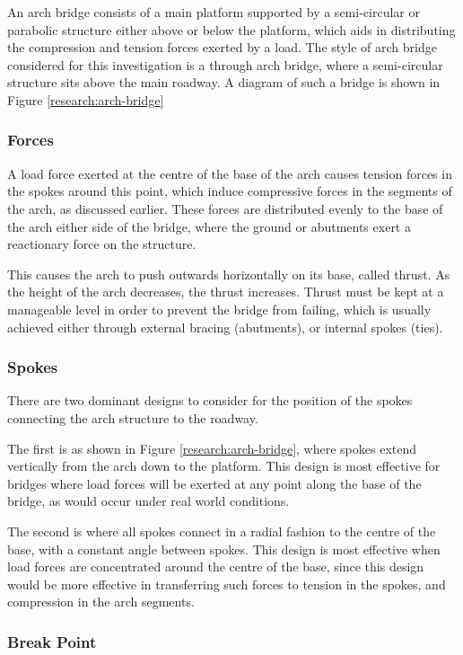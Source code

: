 \documentclass[a4paper,11pt]{article}
\begin{document}
An arch bridge consists of a main platform supported by a semi-circular or
parabolic structure either above or below the platform, which aids in
distributing the compression and tension forces exerted by a load.
The style of arch bridge considered for this investigation is a through arch
bridge, where a semi-circular structure sits above the main roadway.
A diagram of such a bridge is shown in Figure \ref{research:arch-bridge}


\subsubsection{Forces}

A load force exerted at the centre of the base of the arch causes tension forces
in the spokes around this point, which induce compressive forces in the segments
of the arch, as discussed earlier.
These forces are distributed evenly to the base of the arch either
side of the bridge, where the ground or abutments exert a reactionary force on
the structure.

This causes the arch to push outwards horizontally on its base, called thrust.
As the height of the arch decreases, the thrust increases.
Thrust must be kept at a manageable level in order to prevent the bridge from
failing, which is usually achieved either through external bracing (abutments),
or internal spokes (ties).


\subsubsection{Spokes}

There are two dominant designs to consider for the position of the spokes
connecting the arch structure to the roadway.

The first is as shown in Figure \ref{research:arch-bridge}, where spokes extend
vertically from the arch down to the platform.
This design is most effective for bridges where load forces will be exerted
at any point along the base of the bridge, as would occur under real world
conditions.

The second is where all spokes connect in a radial fashion to the centre of the
base, with a constant angle between spokes.
This design is most effective when load forces are concentrated around the
centre of the base, since this design would be more effective in transferring
such forces to tension in the spokes, and compression in the arch segments.


\subsubsection{Break Point}
\end{document}
